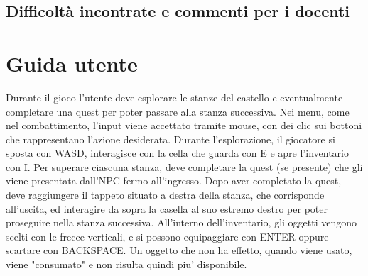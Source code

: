 \documentclass[a4paper,12pt]{report}
\begin{document}
\section{Difficoltà incontrate e commenti per i docenti}

\appendix
\chapter{Guida utente}

Durante il gioco l'utente deve esplorare le stanze del castello e eventualmente completare una quest per poter passare alla stanza successiva.
\newline Nei menu, come nel combattimento, l'input viene accettato tramite mouse, con dei clic sui bottoni che rappresentano l'azione desiderata.
\newline Durante l'esplorazione, il giocatore si sposta con WASD, interagisce con la cella che guarda con E e apre l'inventario con I.
\newline Per superare ciascuna stanza, deve completare la quest (se presente) che gli viene presentata dall'NPC fermo all'ingresso. Dopo aver completato la quest, deve raggiungere il tappeto situato a destra della stanza, che corrisponde all'uscita, ed interagire da sopra la casella al suo estremo destro per poter proseguire nella stanza successiva.
\newline All'interno dell'inventario, gli oggetti vengono scelti con le frecce verticali, e si possono equipaggiare con ENTER oppure scartare con BACKSPACE. Un oggetto che non ha effetto, quando viene usato, viene "consumato" e non risulta quindi piu' disponibile.



\end{document}
